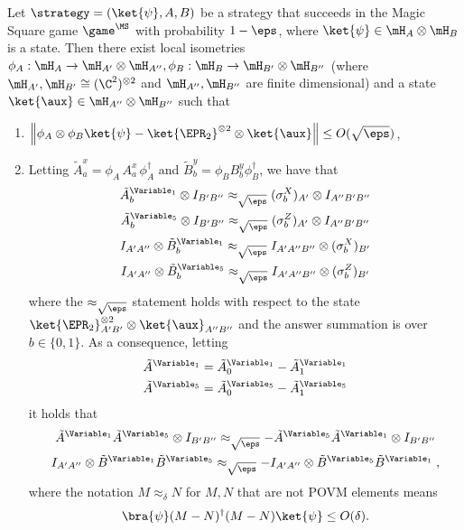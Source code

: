 \begin{theorem}
  \label{thm:ms-rigidity}


Let $\strategy = (\ket{\psi},A,B)$ be a strategy that succeeds in the Magic Square game $\game^{\MS}$ with probability $1 - \eps$, where $\ket{\psi} \in \mH_A \otimes \mH_B$ is a state. Then there exist local isometries $\phi_A: \mH_A \to \mH_{A'} \otimes \mH_{A''},\phi_B: \mH_B \to \mH_{B'} \otimes \mH_{B''}$ (where $\mH_{A'},\mH_{B'} \cong (\C^2)^{\otimes 2}$ and $\mH_{A''},\mH_{B''}$ are finite dimensional) and a state $\ket{\aux} \in \mH_{A''} \otimes \mH_{B''}$ such that 
\begin{enumerate}
    \item $\left \| \phi_A \otimes \phi_B \ket{\psi} - \ket{\EPR_2}^{\otimes 2} \otimes \ket{\aux} \right \| \leq O(\sqrt{\eps})$,
    \item Letting $\tilde{A}^x_a = \phi_A\, A^x_a \, \phi_A^\dagger$ and $\tilde{B}^y_b = \phi_B B^y_b \phi_B^\dagger$, we have that
    \begin{gather*}
        \tilde{A}^{\Variable_1}_b \otimes I_{B'B''} \approx_{\sqrt{\eps}} (\sigma^X_b)_{A'} \otimes I_{A'' B' B''} \\
        \tilde{A}^{\Variable_5}_b \otimes I_{B'B''} \approx_{\sqrt{\eps}} (\sigma^Z_b)_{A'} \otimes I_{A'' B' B''} \\
        I_{A'A''} \otimes \tilde{B}^{\Variable_1}_b    \approx_{\sqrt{\eps}} I_{A' A'' B''} \otimes (\sigma^X_b)_{B'} \\
        I_{A'A''} \otimes \tilde{B}^{\Variable_5}_b    \approx_{\sqrt{\eps}} I_{A' A'' B''} \otimes (\sigma^Z_b)_{B'}
    \end{gather*}
    where the $\approx_{\sqrt{\eps}}$ statement holds with respect to the state $\ket{\EPR_2}^{\otimes 2}_{A'B'} \otimes \ket{\aux}_{A''B''}$ and the answer summation is over $b \in \{0,1\}$. As a consequence, letting 
    \begin{gather*}
    \tilde{A}^{\Variable_1} = \tilde{A}^{\Variable_1}_0 - \tilde{A}^{\Variable_1}_1 \\
    \tilde{A}^{\Variable_5} = \tilde{A}^{\Variable_5}_0 - \tilde{A}^{\Variable_5}_1 \\
    \end{gather*}
    it holds that
    \begin{gather*}
        \tilde{A}^{\Variable_1} \tilde{A}^{\Variable_5} \otimes I_{B' B''} \approx_{\sqrt{\eps}} - \tilde{A}^{\Variable_5}  \tilde{A}^{\Variable_1} \otimes I_{B' B''} \\
        I_{A' A''} \otimes \tilde{B}^{\Variable_1} \tilde{B}^{\Variable_5}  \approx_{\sqrt{\eps}} - I_{A' A''} \otimes \tilde{B}^{\Variable_5}  \tilde{B}^{\Variable_1} \;,
      \end{gather*}
      where the notation $M \approx_{\delta} N$ for $M, N$ that are not POVM
      elements means
      \[  \bra{\psi} (M-N)^\dagger (M-N) \ket{\psi}  \leq  O(\delta). \]
\end{enumerate}

\end{theorem}

